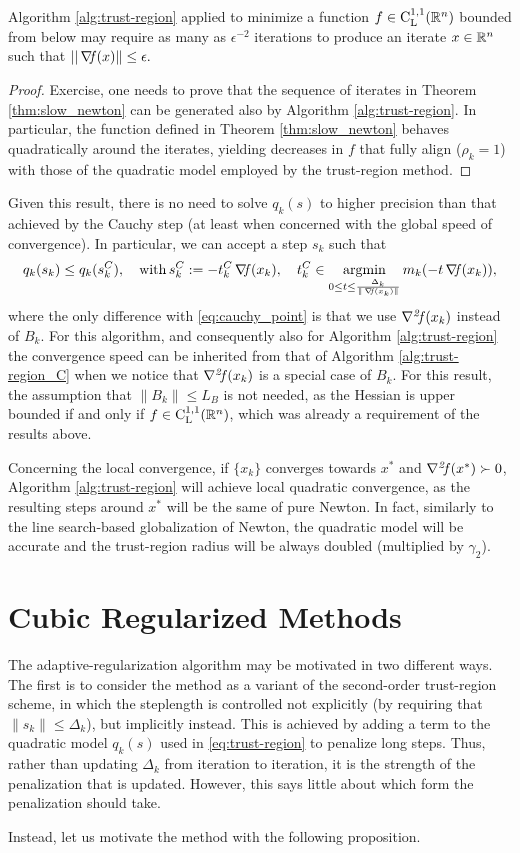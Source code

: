 \documentclass[10pt,a4paper]{article}
\begin{document}
\begin{theorem}\label{thm:slow_trust_region}
	Algorithm \ref{alg:trust-region} applied to minimize a function $f\in \mathord{\mathrm{C^{1,1}_{L}}}(\mathbb{R}^n)$ bounded from below may require as many as $\epsilon^{-2}$ iterations to produce an iterate $x\in \mathbb{R}^n$ such that $||\operatorname*{\mathit{\nabla \!f}} (x)\|\leq \epsilon.$
\end{theorem}
\begin{proof}
	Exercise, one needs to prove that the sequence of iterates in Theorem \ref{thm:slow_newton} can be generated also by Algorithm \ref{alg:trust-region}. In particular, the function defined in Theorem \ref{thm:slow_newton} behaves quadratically around the iterates, yielding decreases in $f$ that fully align ($\rho_k=1$) with those of the quadratic model employed by the trust-region method.
\end{proof}
Given this result, there is no need to solve $q_k(s)$ to higher precision than that achieved by the Cauchy step (at least when concerned with the global speed of convergence). In particular, we can accept a step $s_k$ such that 
\begin{equation*}
	q_k(s_k) \leq q_k(s_k^C), \quad \mathord{\mathrm{with }}\, s_k^C:= -t_k^C\operatorname*{\mathit{\nabla \!f}}(x_k), \quad t_k^C \in \operatorname*{argmin}_{0\leq t\leq \frac{\Delta_k}{\|\operatorname*{\mathit{\nabla \!f}}(x_k)\|}} m_k(-t\operatorname*{\mathit{\nabla \!f}}(x_k)),
\end{equation*}
where the only difference with \eqref{eq:cauchy_point} is that we use $\operatorname*{\mathit{\nabla^2 \!f}}(x_k)$ instead of $B_k$. For this algorithm, and consequently also for Algorithm \ref{alg:trust-region} the convergence speed can be inherited from that of Algorithm \ref{alg:trust-region_C} when we notice that $\operatorname*{\mathit{\nabla^2 \!f}}(x_k)$ is a special case of $B_k$. For this result, the assumption that $\|B_k\|\leq L_B$ is not needed, as the Hessian is upper bounded if and only if $f\in \mathord{\mathrm{C^{1,1}_{L}}}(\mathbb{R}^n)$, which was already a requirement of the results above. 

Concerning the local convergence, if $\{x_k\}$ converges towards $x^*$ and $\operatorname*{\mathit{\nabla^2 \!f}}(x^*)\succ0$, Algorithm \ref{alg:trust-region} will achieve local quadratic convergence, as the resulting steps around $x^*$ will be the same of pure Newton. In fact, similarly to the line search-based globalization of Newton, the quadratic model will be accurate and the trust-region radius will be always doubled (multiplied by $\gamma_2$).

\section{Cubic Regularized Methods}
The adaptive-regularization algorithm may be motivated in two different ways. The first
is to consider the method as a variant of the second-order trust-region scheme, in which
the steplength is controlled not explicitly (by requiring that $\|s_k\|\leq \Delta_k$), but implicitly
instead. This is achieved by adding a term to the quadratic model $q_k(s)$ used in \eqref{eq:trust-region} to penalize long steps. Thus, rather than updating $\Delta_k$ from iteration to iteration, it is the strength of the penalization that is updated. However, this says little about which form the penalization should take.
\par Instead, let us motivate the method with the following proposition.
\end{document}

